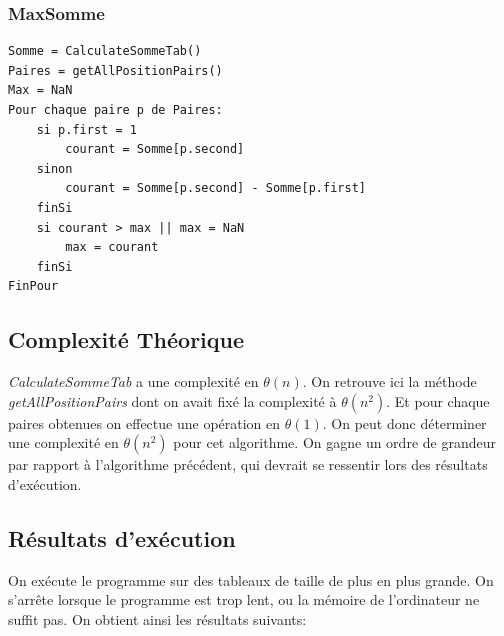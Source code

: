 \documentclass[a4paper, 12pt]{article}
\begin{document}
\subsubsection{MaxSomme}
\begin{verbatim}
Somme = CalculateSommeTab()
Paires = getAllPositionPairs()
Max = NaN
Pour chaque paire p de Paires:
    si p.first = 1
        courant = Somme[p.second]
    sinon
        courant = Somme[p.second] - Somme[p.first]
    finSi
    si courant > max || max = NaN
        max = courant
    finSi
FinPour	
\end{verbatim}
\subsection{Complexité Théorique}
\emph{CalculateSommeTab} a une complexité en $\theta(n)$. On retrouve ici la méthode \emph{getAllPositionPairs} dont on avait fixé la complexité à $\theta(n^2)$. Et pour chaque paires obtenues on effectue une opération en $\theta(1)$. On peut donc déterminer une complexité en $\theta(n^2)$ pour cet algorithme. On gagne un ordre de grandeur par rapport à l'algorithme précédent, qui devrait se ressentir lors des résultats d’exécution. 
\subsection{Résultats d’exécution}
On exécute le programme sur des tableaux de taille de plus en plus grande. On s'arrête lorsque le programme est trop lent, ou la mémoire de l'ordinateur ne suffit pas. On obtient ainsi les résultats suivants:
\end{document}

